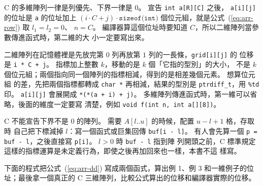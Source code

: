 C 的多維陣列一律是列優先、下界一律是 $0$。 宣告 \texttt{int a[R][C]} 之後，
\texttt{a[i][j]} 的位址是 \texttt{a} 的位址加上 $(i \cdot C + j) \cdot
\texttt{sizeof(int)}$ 個位元組，就是公式~(\ref{eq:arr-row}) 取 $l_1 = l_2 = 0$、
$n = C$。 編譯器算這個位址時要知道 $C$，所以二維陣列當參數傳進函式時，第二維的大
小一定要寫出來。

\begin{cbookrecap}[第~6~章 6.11 節、第~8~章 8.6 節、第~9~章 9.6、9.7 節、第~14~章 14.4 節]
二維陣列在記憶體裡是先放完第 $0$ 列再放第 $1$ 列的一長條，\texttt{grid[i][j]} 的
位移是 \texttt{i * C + j}。 指標加上整數 $k$，移動的是 $k$ 個「它指的型別」的大小，
不是 $k$ 個位元組；兩個指向同一個陣列的指標相減，得到的是相差幾個元素。 想算位元組
的差，先把兩個指標都轉成 \texttt{char *} 再相減，結果的型別是
\texttt{ptrdiff\_t}，用 \texttt{\%td} 印。 \texttt{a[i][j]} 會展開成
\texttt{*(*(a + i) + j)}。 多維陣列傳進函式時，第一維可以省略，後面的維度一定要寫
清楚，例如 \texttt{void f(int n, int a[][8])}。
\end{cbookrecap}

C 不能宣告下界不是 $0$ 的陣列。 需要 $A[l..u]$ 的時候，配置 $u - l + 1$ 格，存取時
自己把下標減掉 $l$：寫一個函式或巨集回傳 \texttt{buf[i - l]}。 有人會先算一個
\texttt{p = buf - l}，之後直接寫 \texttt{p[i]}。 $l > 0$ 時 \texttt{buf - l} 指到陣
列開頭之前，C 標準規定這樣的指標運算是未定義行為，即使之後再加回來也一樣，本書不這
樣寫。

下面的程式把公式~(\ref{eq:arr-dd}) 寫成兩個函式，算出例 1、例 3 和一維例子的位
址；最後拿一個真正的 C 三維陣列，比較公式算出的位移和編譯器實際的位移。

